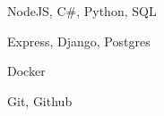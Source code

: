 \documentclass[11pt]{spidercv}
\begin{document}
\begin{SideBar}{\ColorBackground}{\ColorTextSide}






    \begin{ItemList}{\ColorHighlight}
        \item [\faCode] NodeJS, C\#, Python, SQL
        \item [\faFileCodeO]  Express, Django, Postgres
        \item [\faCubes]  Docker
        \item [\faPencilSquareO]  Git, Github
    \end{ItemList}

    \vspace*{1cm}


    \begin{SpiderDiagram}{\ColorTextSide}{\ColorHighlight}
    \end{SpiderDiagram}

    \vspace*{1cm}


    \begin{SkillGauges}{\ColorHighlight}
    \end{SkillGauges}
\end{SideBar}
\end{document}
